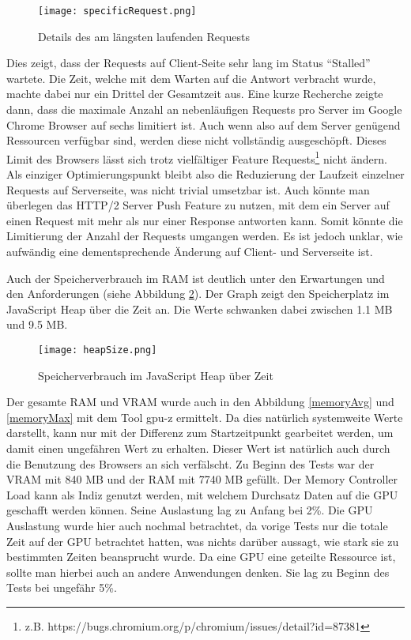 \begin{figure}[H]
  \centering
  \texttt{[image: specificRequest.png]}
  \caption{Details des am längsten laufenden Requests}
  \label{specificRequest}
\end{figure}

Dies zeigt, dass der Requests auf Client-Seite sehr lang im Status “Stalled” wartete. Die Zeit, welche mit dem Warten auf die Antwort verbracht wurde, machte dabei nur ein Drittel der Gesamtzeit aus. Eine kurze Recherche zeigte dann, dass die maximale Anzahl an nebenläufigen Requests pro Server im Google Chrome Browser auf sechs limitiert ist. Auch wenn also auf dem Server genügend Ressourcen verfügbar sind, werden diese nicht vollständig ausgeschöpft. Dieses Limit des Browsers lässt sich trotz vielfältiger Feature Requests\footnote{z.B. https://bugs.chromium.org/p/chromium/issues/detail?id=87381} nicht ändern. Als einziger Optimierungspunkt bleibt also die Reduzierung der Laufzeit einzelner Requests auf Serverseite, was nicht trivial umsetzbar ist. Auch könnte man überlegen das HTTP/2 Server Push Feature zu nutzen, mit dem ein Server auf einen Request mit mehr als nur einer Response antworten kann. Somit könnte die Limitierung der Anzahl der Requests umgangen werden. Es ist jedoch unklar, wie aufwändig eine dementsprechende Änderung auf Client- und Serverseite ist.

Auch der Speicherverbrauch im RAM ist deutlich unter den Erwartungen und den Anforderungen (siehe Abbildung \ref{heapSize}). Der Graph zeigt den Speicherplatz im JavaScript Heap über die Zeit an. Die Werte schwanken dabei zwischen 1.1 MB und 9.5 MB.

\begin{figure}[H]
  \texttt{[image: heapSize.png]}
  \caption{Speicherverbrauch im JavaScript Heap über Zeit}
  \label{heapSize}
\end{figure}

Der gesamte RAM und VRAM wurde auch in den Abbildung \ref{memoryAvg} und \ref{memoryMax} mit dem Tool gpu-z ermittelt. Da dies natürlich systemweite Werte darstellt, kann nur mit der Differenz zum Startzeitpunkt gearbeitet werden, um damit einen ungefähren Wert zu erhalten. Dieser Wert ist natürlich auch durch die Benutzung des Browsers an sich verfälscht. Zu Beginn des Tests war der VRAM mit 840 MB und der RAM mit 7740 MB gefüllt. Der Memory Controller Load kann als Indiz genutzt werden, mit welchem Durchsatz Daten auf die GPU geschafft werden können. Seine Auslastung lag zu Anfang bei 2\%. Die GPU Auslastung wurde hier auch nochmal betrachtet, da vorige Tests nur die totale Zeit auf der GPU betrachtet hatten, was nichts darüber aussagt, wie stark sie zu bestimmten Zeiten beansprucht wurde. Da eine GPU eine geteilte Ressource ist, sollte man hierbei auch an andere Anwendungen denken. Sie lag zu Beginn des Tests bei ungefähr 5\%.


